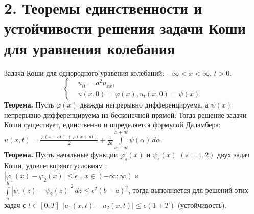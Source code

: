 \documentclass[11pt,a4paper]{article}
\begin{document}
    \section*{2. Теоремы единственности и устойчивости решения задачи Коши для уравнения колебания}
    Задача Коши для однородного уравения колебаний: $-\infty<x<\infty$, $t>0$.
    \[ \left\{\begin{aligned}
    &u_{tt}=a^2u_{xx}, \\ & u(x,0)=\varphi(x), u_t(x,0)=\psi(x)
    \end{aligned}\right. \]
    \textbf{Теорема.}
    Пусть $\varphi(x)$ дважды непрерывно дифференцируема, а $\psi(x)$ непрерывно дифференцируема на бесконечной прямой. Тогда решение задачи Коши существует, единственно и определяется формулой Даламбера:\\ $u(x,t)=\frac{\varphi(x-at)+\varphi(x+at)}{2}+\frac{1}{2a}\int\limits_{x-at}^{x+at} \psi(\alpha) \,d\alpha$.
    \\
    \textbf{Теорема.}
    Пусть начальные функции $\varphi_s(x)$ и $\psi_s(x)$ $(s=1,2)$ двух задач Коши, удовлетворяют условиям :\\
    $|\varphi_1(x)-\varphi_2(x)|\leq \epsilon$ , $x\in (-\infty ; \infty)$
    и $\int\limits_a^b |\psi_1(z)-\psi_2(z)|^2 \,dz \leq \epsilon^2(b-a)^2 $,
    тогда выполняется для решений этих задач с $t\in[0,T]$ $|u_1(x,t)-u_2(x,t)|\leq\epsilon(1+T)$ (устойчивость).
    
\end{document}
